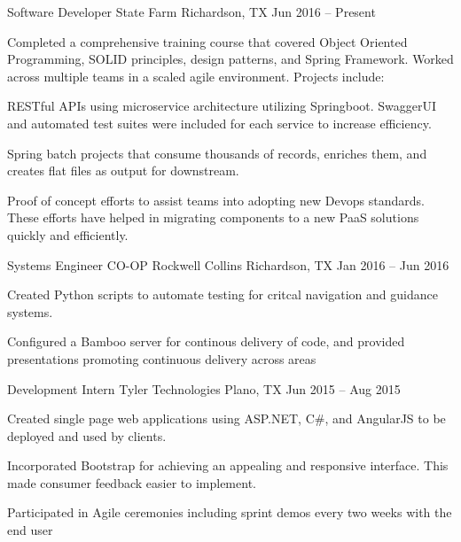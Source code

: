 \documentclass[]{awesome-cv}
\begin{document}
\vspace{-2mm}
\begin{cventries}
	\cventry
	{Software Developer}
	{State Farm}
	{Richardson, TX}
	{Jun 2016 – Present}
	{Completed a comprehensive training course that covered Object Oriented Programming, SOLID principles, design patterns, and Spring Framework. Worked across multiple teams in a scaled agile environment. Projects include:
	\linebreak[4] \vspace{1mm}
		\begin{cvitems}
		\item {RESTful APIs using microservice architecture utilizing Springboot. SwaggerUI and automated test suites were included for each service to increase efficiency.}
		\item {Spring batch projects that consume thousands of records, enriches them, and creates flat files as output for downstream.}
		\item {Proof of concept efforts to assist teams into adopting new Devops standards. These efforts have helped in migrating components to a new PaaS solutions quickly and efficiently.}
		\end{cvitems}}

	\cventry
	{Systems Engineer CO-OP}
	{Rockwell Collins}
	{Richardson, TX}
	{Jan 2016 – Jun 2016}
	{\begin{cvitems}
		\item {Created Python scripts to automate testing for critcal navigation and guidance systems.}
		\item {Configured a Bamboo server for continous delivery of code, and provided presentations promoting continuous delivery across areas }
		\end{cvitems}}

	\cventry
	{Development Intern}
	{Tyler Technologies}
	{Plano, TX}
	{Jun 2015 – Aug 2015}
	{\begin{cvitems}
		\item {Created single page web applications using ASP.NET, C\#, and AngularJS to be deployed and used by clients.}
		\item {Incorporated Bootstrap  for achieving an appealing and responsive interface. This made consumer feedback easier to implement.}
		\item {Participated in Agile ceremonies including sprint demos every two weeks with the end user}
		\end{cvitems}}

\end{cventries}
\end{document}
